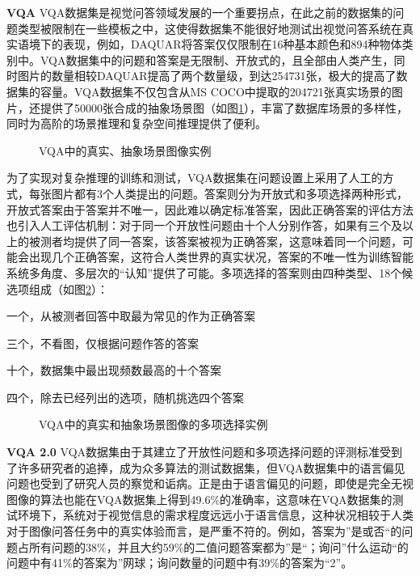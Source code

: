 \textbf{VQA}
VQA数据集是视觉问答领域发展的一个重要拐点，在此之前的数据集的问题类型被限制在一些模板之中，这使得数据集不能很好地测试出视觉问答系统在真实语境下的表现，例如，DAQUAR将答案仅仅限制在16种基本颜色和894种物体类别中。VQA数据集中的问题和答案是无限制、开放式的，且全部由人类产生，同时图片的数量相较DAQUAR提高了两个数量级，到达254731张，极大的提高了数据集的容量。VQA数据集不仅包含从MS COCO中提取的204721张真实场景的图片，还提供了50000张合成的抽象场景图（如图\ref{vqa-exmaple}），丰富了数据库场景的多样性，同时为高阶的场景推理和复杂空间推理提供了便利。
\begin{figure}[H]
	\centering
	\caption{VQA中的真实、抽象场景图像实例}
	\label{vqa-exmaple}
\end{figure}

为了实现对复杂推理的训练和测试，VQA数据集在问题设置上采用了人工的方式，每张图片都有3个人类提出的问题。答案则分为开放式和多项选择两种形式，开放式答案由于答案并不唯一，因此难以确定标准答案，因此正确答案的评估方法也引入人工评估机制：对于同一个开放性问题由十个人分别作答，如果有三个及以上的被测者均提供了同一答案，该答案被视为正确答案，这意味着同一个问题，可能会出现几个正确答案，这符合人类世界的真实状况，答案的不唯一性为训练智能系统多角度、多层次的“认知”提供了可能。多项选择的答案则由四种类型、18个候选项组成（如图\ref{vqa-multi}）：
\begin{description}[labelindent=2em, leftmargin=6em, style=sameline]  
\item [正确答案] 一个，从被测者回答中取最为常见的作为正确答案
\item [混淆答案] 三个，不看图，仅根据问题作答的答案
\item [常见答案] 十个，数据集中最出现频数最高的十个答案
\item [随机答案] 四个，除去已经列出的选项，随机挑选四个答案
\end{description}
\begin{figure}[H]
	\centering
	\caption{VQA中的真实和抽象场景图像的多项选择实例}
	\label{vqa-multi}
\end{figure}

\textbf{VQA 2.0}
VQA数据集由于其建立了开放性问题和多项选择问题的评测标准受到了许多研究者的追捧，成为众多算法的测试数据集，但VQA数据集中的语言偏见问题也受到了研究人员的察觉和诟病。正是由于语言偏见的问题，即使是完全无视图像的算法也能在VQA数据集上得到49.6\%的准确率，这意味在VQA数据集的测试环境下，系统对于视觉信息的需求程度远远小于语言信息，这种状况相较于人类对于图像问答任务中的真实体验而言，是严重不符的。例如，答案为”是或否“的问题占所有问题的38\%，并且大约59\%的二值问题答案都为”是“；询问”什么运动“的问题中有41\%的答案为”网球；询问数量的问题中有39\%的答案为“2”。

